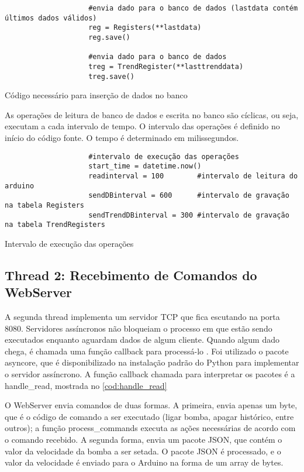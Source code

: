 				\begin{listing}[!htb]
					\begin{verbatim}
					#envia dado para o banco de dados (lastdata contém últimos dados válidos)
					reg = Registers(**lastdata)
					reg.save()
					
					#envia dado para o banco de dados
					treg = TrendRegister(**lasttrenddata)
					treg.save()
					\end{verbatim}
					\caption{Código necessário para inserção de dados no banco}
					\label{cod:insert_data}
				\end{listing}
			
				As operações de leitura de banco de dados e escrita no banco são cíclicas, ou seja, executam a cada intervalo de tempo. O intervalo das operações é definido no início do código fonte. O tempo é determinado em milissegundos.
				
				\begin{listing}[!htb]
					\begin{verbatim}
					#intervalo de execução das operações
					start_time = datetime.now()
					readinterval = 100        #intervalo de leitura do arduino
					sendDBinterval = 600      #intervalo de gravação na tabela Registers
					sendTrendDBinterval = 300 #intervalo de gravação na tabela TrendRegisters
					\end{verbatim}
					\caption{Intervalo de execução das operações}
					\label{cod:set_interval}
				\end{listing}
			
			\subsection{Thread 2: Recebimento de Comandos do WebServer}
				A segunda thread implementa um servidor TCP que fica escutando na porta 8080. Servidores assíncronos não bloqueiam o processo em que estão sendo executados enquanto aguardam dados de algum cliente. Quando algum dado chega, é chamada uma função callback para processá-lo \cite{pythondoc}. Foi utilizado o pacote asyncore, que é disponibilizado na instalação padrão do Python para implementar o servidor assíncrono. A função callback chamada para interpretar os pacotes é a handle\_read, mostrada no \autoref{cod:handle_read}
				
				O WebServer envia comandos de duas formas. A primeira, envia apenas um byte, que é o código de comando a ser executado (ligar bomba, apagar histórico, entre outros); a função process\_commands executa as ações necessárias de acordo com o comando recebido. A segunda forma, envia um pacote JSON, que contém o valor da velocidade da bomba a ser setada. O pacote JSON é processado, e o valor da velocidade é enviado para o Arduino na forma de um array de bytes.
				
